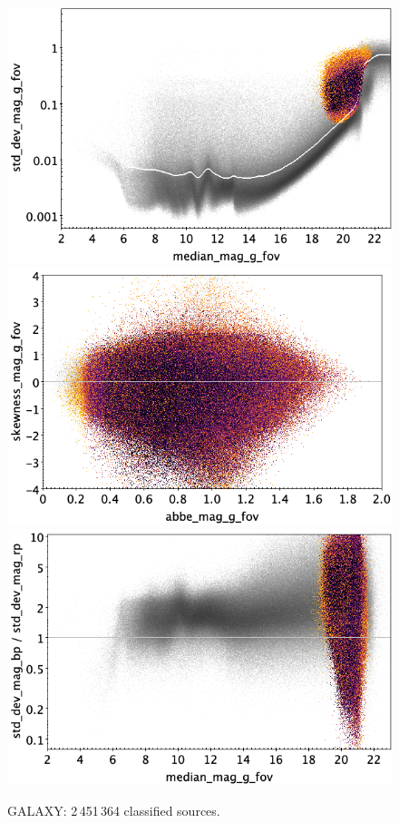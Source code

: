 \documentclass[longauth]{aa}
\begin{document}
\begin{appendix}
\begin{figure}
\hspace{2mm}
 \includegraphics[width=0.45\hsize]{figures/appendix/GALAXY_ALL_cls_msd.png} \\ %
\vspace{4mm}
 \includegraphics[width=0.45\hsize]{figures/appendix/GALAXY_ALL_cls_ask.png}  %
\hspace{2mm}
 \includegraphics[width=0.45\hsize]{figures/appendix/GALAXY_ALL_cls_msdr.png}  \\ %
\vspace{4mm}
 \caption{GALAXY: 2\,451\,364 classified sources.}  
 \label{fig:app:GALAXY_ALL}
\end{figure}



\end{appendix}
\end{document}
